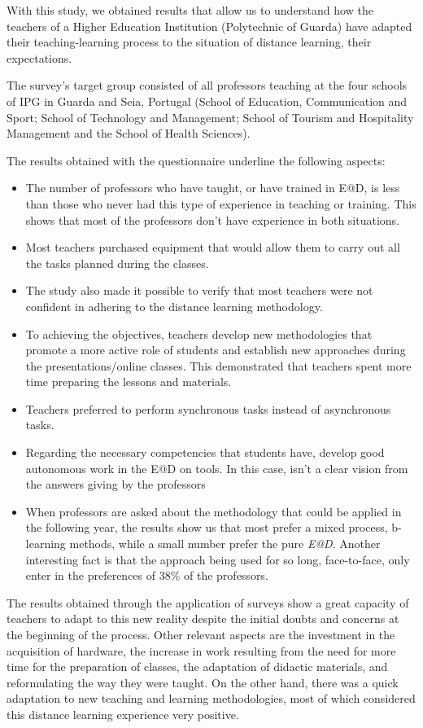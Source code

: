 \documentclass{textolivre}
\begin{document}
With this study, we obtained results that allow us to understand how the teachers of a Higher Education Institution (Polytechnic of Guarda) have adapted their teaching-learning process to the situation of distance learning, their expectations.

The survey's target group consisted of all professors teaching at the four schools of IPG in Guarda and Seia, Portugal (School of Education, Communication and Sport; School of Technology and Management; School of Tourism and Hospitality Management and the School of Health Sciences). 

The results obtained with the questionnaire underline the following aspects:

\begin{itemize}
    \item The number of professors who have taught, or have trained in E@D, is less than those who never had this type of experience in teaching or training. This shows that most of the professors don't have experience in both situations.
    \item Most teachers purchased equipment that would allow them to carry out all the tasks planned during the classes.
    \item The study also made it possible to verify that most teachers were not confident in adhering to the distance learning methodology.
    \item To achieving the objectives, teachers develop new methodologies that promote a more active role of students and establish new approaches during the presentations/online classes. This demonstrated that teachers spent more time preparing the lessons and materials.
    \item Teachers preferred to perform synchronous tasks instead of asynchronous tasks.
    \item Regarding the necessary competencies that students have, develop good autonomous work in the E@D on tools. In this case, isn't a clear vision from the answers giving by the professors
    \item When professors are asked about the methodology that could be applied in the following year, the results show us that most prefer a mixed process, b-learning methods, while a small number prefer the pure \emph{E@D}. Another interesting fact is that the approach being used for so long, face-to-face, only enter in the preferences of 38\% of the professors.
\end{itemize}

The results obtained through the application of surveys show a great capacity of teachers to adapt to this new reality despite the initial doubts and concerns at the beginning of the process. Other relevant aspects are the investment in the acquisition of hardware, the increase in work resulting from the need for more time for the preparation of classes, the adaptation of didactic materials, and reformulating the way they were taught. On the other hand, there was a quick adaptation to new teaching and learning methodologies, most of which considered this distance learning experience very positive.
\end{document}
